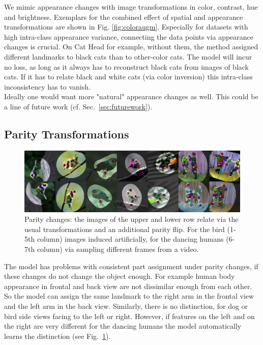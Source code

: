 			We mimic appearance changes with image transformations in color, contrast, hue and brightness. Exemplars for the combined effect of spatial and appearance transformations are shown in Fig. \ref{fig:coloraugm}.
			Especially for datasets with high intra-class appearance variance, connecting the data points via appearance changes is crucial. On Cat Head for example, without them, the method assigned different landmarks to black cats than to other-color cats. The model will incur no loss, as long as it always has to reconstruct black cats from images of black cats. If it has to relate black and white cats (\eg via color inversion) this intra-class inconsistency has to vanish.\\
			Ideally one would want more "natural" appearance changes as well. This could be a line of future work (cf. Sec.~\ref{sec:futurework}).


		\subsection{Parity Transformations}\label{sec:parity}
			\begin{figure}[htp]
				\centering
				\includegraphics[trim={0cm 0cm 0cm 0cm},clip, width=1.\linewidth]{fig/shape/parity}
				\caption{Parity changes: the images of the upper and lower row relate via the usual transformations and an additional parity flip. For the bird (1-5th column) images induced artificially, for the dancing humans (6-7th column) via sampling different frames from a video.}
				\label{fig:parity}
			\end{figure}
			The model has problems with consistent part assignment under parity changes, if these changes do not change the object enough. For example human body appearance in frontal and back view are not dissimilar enough from each other. So the model can assign the same landmark to \eg the right arm in the frontal view and the left arm in the back view.
			Similarly, there is no distinction, for dog or bird side views facing to the left or right. However, if features on the left and on the right are very different \eg for the dancing humans the model automatically learns the distinction (see Fig.~\ref{fig:parity}).

